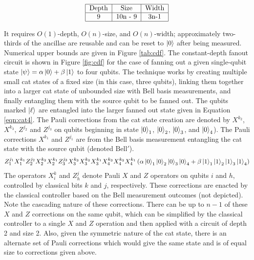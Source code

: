 \documentclass[twoside]{article}
\begin{document}
\begin{table}
\begin{displaymath}
\begin{tabular}{|c|c|c|c|}
\hline
\text{Depth} & \text{Size} & \text{Width} \\
\hline
9 & 10n - 9 & 3n-1 \\
\hline
\end{tabular}
\end{displaymath}
\centerline{}
\label{tab:cdf}
\end{table}

It requires $O(1)$-depth, $O(n)$-size, and $O(n)$-width; approximately
two-thirds of the ancillae are reusable and can be reset to $\left\vert{0}\right\rangle$ after
being measured. Numerical upper bounds are given in Figure \ref{tab:cdf}.
The constant-depth fanout circuit is shown in Figure \ref{fig:cdf} for the case of fanning out a given single-qubit state
$\left\vert{\psi}\right\rangle = \alpha\left\vert{0}\right\rangle + \beta\left\vert{1}\right\rangle$ to four qubits.
The technique works by creating multiple small
cat states of a fixed size (in this case, three qubits), linking them
together into a larger cat state of unbounded size with Bell basis measurements,
and finally entangling them with the source qubit to be fanned out.
The qubits marked $\left\vert{\ell}\right\rangle$ are
entangled into the larger fanned out state given in Equation \ref{eqn:cat4}.
The Pauli corrections from the cat state creation are denoted by
$X^{k_2}$, $X^{k_3}$, $Z^{j_2}$ and $Z^{j_3}$ on qubits beginning in state $\left\vert{0}\right\rangle_1$, $\left\vert{0}\right\rangle_2$,
$\left\vert{0}\right\rangle_3$, and $\left\vert{0}\right\rangle_4$). The Pauli corrections
$X^{k_1}$ and $Z^{j_1}$ are from the Bell basis measurement
entangling the cat state with the source qubit (denoted $\text{Bell}'$).
\begin{equation}
Z_1^{j_1}X_1^{k_1}Z_2^{j_2}X_2^{k_2}X_2^{k_1}Z_{3}^{j_3}X_{3}^{k_3}X_{3}^{k_2}X_{3}^{k_1}X_{4}^{k_3}X_{4}^{k_2}X_{4}^{k_1}
\left(\alpha \left\vert{0}\right\rangle_1\left\vert{0}\right\rangle_2\left\vert{0}\right\rangle_3\left\vert{0}\right\rangle_4 + \beta \left\vert{1}\right\rangle_1\left\vert{1}\right\rangle_2\left\vert{1}\right\rangle_3\left\vert{1}\right\rangle_4 \right)
\label{eqn:cat4}
\end{equation}
%
The operators $X^k_i$ and $Z^j_{h}$ denote Pauli $X$ and $Z$ operators
on qubits $i$ and $h$, controlled by classical bits $k$ and $j$,
respectively. These corrections are enacted by the classical controller based on
the Bell measurement outcomes (not depicted).
Note the cascading nature of these corrections.
There can be up to
$n-1$ of these $X$ and $Z$
corrections on the same qubit, which can be simplified by the classical
controller to a single $X$ and $Z$ operation and then applied with a circuit of
depth 2 and size 2. Also, given the symmetric nature of the cat state, there
is an alternate set of Pauli corrections which would give the same state and
is of equal size to corrections given above.
\end{document}
